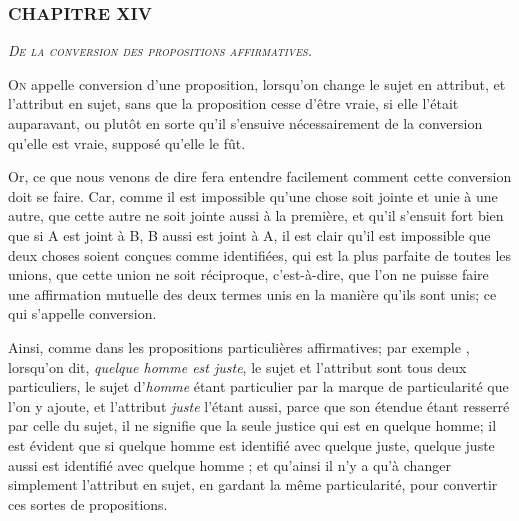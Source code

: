\subsubsection{\centering \Large CHAPITRE XIV}
\begin{center}\emph{\large\scshape De la conversion des propositions affirmatives.}\end{center}

	\lettrine{O}{n} appelle conversion d'une proposition, lorsqu'on change le sujet en attribut, et l'attribut en sujet, sans que la proposition cesse d'être vraie, si elle l'était auparavant, ou plutôt en sorte qu'il s'ensuive nécessairement de la conversion qu'elle est vraie, supposé qu'elle le fût.

Or, ce que nous venons de dire fera entendre facilement comment cette conversion doit se faire. Car, comme il est impossible qu'une chose soit jointe et unie à une autre, que cette autre ne soit jointe aussi à la première, et qu'il s'ensuit fort bien que si A est joint à B, B aussi est joint à A, il est clair qu'il est impossible que deux choses soient conçues comme identifiées, qui est la plus parfaite de toutes les unions, que cette union ne soit réciproque, c'est-à-dire, que l'on ne puisse faire une affirmation mutuelle des deux termes unis en la manière qu'ils sont unis; ce qui s'appelle conversion.

Ainsi, comme dans les propositions particulières affirmatives; par exemple
, lorsqu'on dit, \emph{quelque homme est juste}, le sujet et l'attribut sont tous deux particuliers, le sujet d'\emph{homme} étant particulier par la marque de particularité que l'on y ajoute, et l'attribut \emph{juste} l'étant aussi, parce que son étendue étant resserré par celle du sujet, il ne signifie que la seule justice qui est en quelque homme; il est évident que si quelque homme est identifié avec quelque juste, quelque juste aussi est identifié avec quelque homme ; et qu'ainsi il n'y a qu'à changer simplement l'attribut en sujet, en gardant la même particularité, pour convertir ces sortes de propositions.

